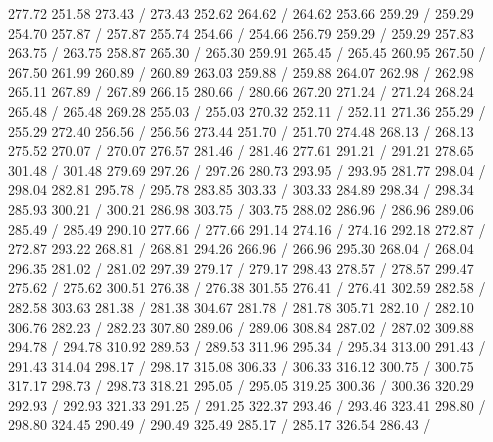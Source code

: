 { 277.72 251.58 273.43 /
 273.43 252.62 264.62 /
 264.62 253.66 259.29 /
 259.29 254.70 257.87 /
 257.87 255.74 254.66 /
 254.66 256.79 259.29 /
 259.29 257.83 263.75 /
 263.75 258.87 265.30 /
 265.30 259.91 265.45 /
 265.45 260.95 267.50 /
 267.50 261.99 260.89 /
 260.89 263.03 259.88 /
 259.88 264.07 262.98 /
 262.98 265.11 267.89 /
 267.89 266.15 280.66 /
 280.66 267.20 271.24 /
 271.24 268.24 265.48 /
 265.48 269.28 255.03 /
 255.03 270.32 252.11 /
 252.11 271.36 255.29 /
 255.29 272.40 256.56 /
 256.56 273.44 251.70 /
 251.70 274.48 268.13 /
 268.13 275.52 270.07 /
 270.07 276.57 281.46 /
 281.46 277.61 291.21 /
 291.21 278.65 301.48 /
 301.48 279.69 297.26 /
 297.26 280.73 293.95 /
 293.95 281.77 298.04 /
 298.04 282.81 295.78 /
 295.78 283.85 303.33 /
 303.33 284.89 298.34 /
 298.34 285.93 300.21 /
 300.21 286.98 303.75 /
 303.75 288.02 286.96 /
 286.96 289.06 285.49 /
 285.49 290.10 277.66 /
 277.66 291.14 274.16 /
 274.16 292.18 272.87 /
 272.87 293.22 268.81 /
 268.81 294.26 266.96 /
 266.96 295.30 268.04 /
 268.04 296.35 281.02 /
 281.02 297.39 279.17 /
 279.17 298.43 278.57 /
 278.57 299.47 275.62 /
 275.62 300.51 276.38 /
 276.38 301.55 276.41 /
 276.41 302.59 282.58 /
 282.58 303.63 281.38 /
 281.38 304.67 281.78 /
 281.78 305.71 282.10 /
 282.10 306.76 282.23 /
 282.23 307.80 289.06 /
 289.06 308.84 287.02 /
 287.02 309.88 294.78 /
 294.78 310.92 289.53 /
 289.53 311.96 295.34 /
 295.34 313.00 291.43 /
 291.43 314.04 298.17 /
 298.17 315.08 306.33 /
 306.33 316.12 300.75 /
 300.75 317.17 298.73 /
 298.73 318.21 295.05 /
 295.05 319.25 300.36 /
 300.36 320.29 292.93 /
 292.93 321.33 291.25 /
 291.25 322.37 293.46 /
 293.46 323.41 298.80 /
 298.80 324.45 290.49 /
 290.49 325.49 285.17 /
 285.17 326.54 286.43 /
}
